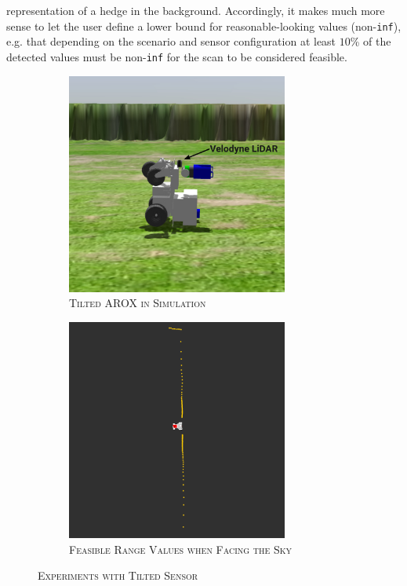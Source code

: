 \documentclass[english, master, utf8]{base/thesis_KBS}
\newcommand{\code}[1]{\colorbox{light-gray}{\texttt{#1}}}
\begin{document}
representation of a hedge in the background. Accordingly, it makes much more sense to let the user define a lower bound for reasonable-looking values (non-\code{inf}),
e.g. that depending on the scenario and sensor configuration at least $10$\% of the detected values must be non-\code{inf} for the scan to be considered feasible.
\begin{figure}[H]
    \centering
    \begin{subfigure}[b]{0.49\textwidth}
        \centering
        \includegraphics[width=0.8\textwidth]{pics/tilted_AROX.png}
        \caption{\textsc{Tilted AROX in Simulation}}
        \label{fig:tilted_AROX}
    \end{subfigure}
    \hfill
    \begin{subfigure}[b]{0.49\textwidth}
        \centering
        \includegraphics[width=0.8\textwidth]{pics/straight_line.png}
        \caption{\textsc{Feasible Range Values when Facing the Sky}}
        \label{fig:straight_line}
    \end{subfigure}
\caption{\textsc{Experiments with Tilted Sensor}}
\label{fig:prototype_sim}
\end{figure}
\end{document}

